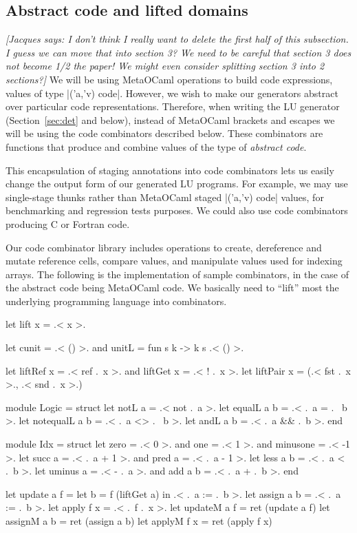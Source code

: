\documentclass{elsart}
\newcommand{\jacques}[1]{{\it [Jacques says: #1]}}
\begin{document}
\subsection{Abstract code and lifted domains}\label{sec:lifteddomains}
\jacques{I don't think I really want to delete the first half of this
subsection.  I guess we can move that into section 3?  We need to be
careful that section 3 does not become 1/2 the paper!  We might even
consider splitting section 3 into 2 sections?}
We will be using MetaOCaml operations to build code expressions, values
of type |('a,'v) code|. However, we wish to make our generators
abstract over particular code representations. Therefore, when writing
the LU generator (Section~\ref{sec:det} and below), instead of
MetaOCaml brackets and escapes we will be using the code combinators
described below. These combinators are functions that produce and
combine values of the type of \emph{abstract code}. 

This encapsulation of staging annotations into code combinators lets
us easily change the output form of our generated LU programs.  For example,
we may use single-stage thunks rather than MetaOCaml staged |('a,'v) code|
values, for benchmarking and regression tests purposes. We could also use
code combinators producing C or Fortran code.

Our code combinator library includes operations to create, dereference
and mutate reference cells, compare values, and manipulate values used
for indexing arrays. The following is the implementation of sample
combinators, in the case of the abstract code being MetaOCaml code. 
We basically need to ``lift'' most the underlying programming language
into combinators.
\begin{code}
let lift x = .< x >.

let cunit = .< () >.  and unitL = fun s k -> k s .< () >.

let liftRef x = .< ref .~x >.  and   liftGet x = .< ! .~x >. 
let liftPair x = (.< fst .~x >., .< snd .~x >.)

module Logic = struct
  let notL a        = .< not .~a >.
  let equalL a b    = .< .~a = .~ b >.
  let notequalL a b = .< .~a <> .~ b >.
  let andL a b     = .< .~a && .~b >. 
end

module Idx = struct
  let zero = .< 0 >. and one = .< 1 >. and minusone = .< -1 >.
  let succ a = .< .~a + 1 >.  and  pred a = .< .~a - 1 >.
  let less a b = .< .~a < .~b >.
  let uminus a = .< - .~a >.  and  add a b = .< .~a + .~b >.
end

let update a f = let b = f (liftGet a) in .< .~a := .~b >.
let assign a b = .< .~a := .~b >.
let apply  f x = .< .~f .~x >.
let updateM a f = ret (update a f)
let assignM a b = ret (assign a b)
let applyM  f x = ret (apply f x)
\end{code}
\end{document}
